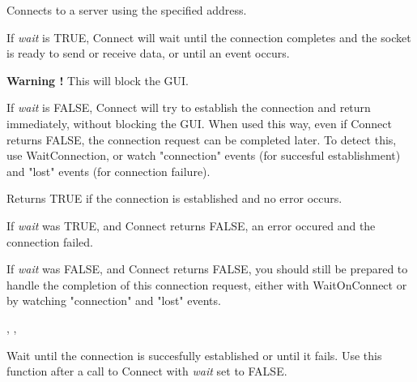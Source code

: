 %
%
\label{wxsocketclientconnect}


Connects to a server using the specified address.

If {\it wait} is TRUE, Connect will wait until the connection completes and
the socket is ready to send or receive data, or until an event occurs.

{\bf Warning !} This will block the GUI. 

If {\it wait} is FALSE, Connect will try to establish the connection and
return immediately, without blocking the GUI. When used this way, even if
Connect returns FALSE, the connection request can be completed later.
To detect this, use WaitConnection, or watch "connection" events (for
succesful establishment) and "lost" events (for connection failure).





Returns TRUE if the connection is established and no error occurs.

If {\it wait} was TRUE, and Connect returns FALSE, an error occured
and the connection failed.

If {\it wait} was FALSE, and Connect returns FALSE, you should still
be prepared to handle the completion of this connection request, either
with WaitOnConnect or by watching "connection" and "lost" events.


, 
, 

%
%
\label{wxsocketclientwaitonconnect}


Wait until the connection is succesfully established or until it fails.
Use this function after a call to Connect with {\it wait} set to FALSE. 


